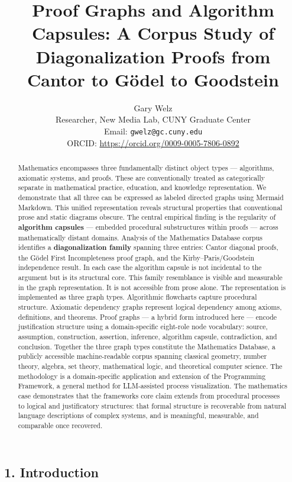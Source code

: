 \documentclass[
  11pt]{article}
\title{Proof Graphs and Algorithm Capsules: A Corpus Study of
Diagonalization Proofs from Cantor to Gödel to Goodstein}
\author{Gary Welz \\[0.6em]{\normalsize Researcher, New Media Lab, CUNY Graduate Center} \\[0.35em]{\normalsize Email: \texttt{gwelz@gc.cuny.edu}} \\[0.35em]{\normalsize ORCID: \url{https://orcid.org/0009-0005-7806-0892}}}
\date{}
\begin{document}
\maketitle
\begin{abstract}
Mathematics encompasses three fundamentally distinct object types ---
algorithms, axiomatic systems, and proofs. These are conventionally
treated as categorically separate in mathematical practice, education,
and knowledge representation. We demonstrate that all three can be
expressed as labeled directed graphs using Mermaid Markdown. This
unified representation reveals structural properties that conventional
prose and static diagrams obscure. The central empirical finding is the
regularity of \textbf{algorithm capsules} --- embedded procedural
substructures within proofs --- across mathematically distant domains.
Analysis of the Mathematics Database corpus identifies a
\textbf{diagonalization family} spanning three entries: Cantor diagonal
proofs, the Gödel First Incompleteness proof graph, and the
Kirby--Paris/Goodstein independence result. In each case the algorithm
capsule is not incidental to the argument but is its structural core.
This family resemblance is visible and measurable in the graph
representation. It is not accessible from prose alone. The
representation is implemented as three graph types. Algorithmic
flowcharts capture procedural structure. Axiomatic dependency graphs
represent logical dependency among axioms, definitions, and theorems.
Proof graphs --- a hybrid form introduced here --- encode justification
structure using a domain-specific eight-role node vocabulary: source,
assumption, construction, assertion, inference, algorithm capsule,
contradiction, and conclusion. Together the three graph types constitute
the Mathematics Database, a publicly accessible machine-readable corpus
spanning classical geometry, number theory, algebra, set theory,
mathematical logic, and theoretical computer science. The methodology is
a domain-specific application and extension of the Programming
Framework, a general method for LLM-assisted process visualization. The
mathematics case demonstrates that the framework\textquotesingle s core
claim extends from procedural processes to logical and justificatory
structures: that formal structure is recoverable from natural language
descriptions of complex systems, and is meaningful, measurable, and
comparable once recovered.
\end{abstract}

\hypertarget{1-introduction}{%
\subsection{1. Introduction}\label{1-introduction}}
\end{document}
